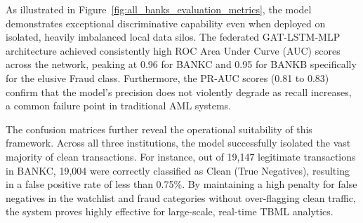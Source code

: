 \documentclass[conference]{IEEEtran}
\begin{document}
As illustrated in Figure~\ref{fig:all_banks_evaluation_metrics}, the model demonstrates exceptional discriminative capability even when deployed on isolated, heavily imbalanced local data silos. The federated GAT-LSTM-MLP architecture achieved consistently high ROC Area Under Curve (AUC) scores across the network, peaking at 0.96 for BANKC and 0.95 for BANKB specifically for the elusive Fraud class. Furthermore, the PR-AUC scores (0.81 to 0.83) confirm that the model's precision does not violently degrade as recall increases, a common failure point in traditional AML systems.

The confusion matrices further reveal the operational suitability of this framework. Across all three institutions, the model successfully isolated the vast majority of clean transactions. For instance, out of 19,147 legitimate transactions in BANKC, 19,004 were correctly classified as Clean (True Negatives), resulting in a false positive rate of less than 0.75\%. By maintaining a high penalty for false negatives in the watchlist and fraud categories without over-flagging clean traffic, the system proves highly effective for large-scale, real-time TBML analytics.
\end{document}
